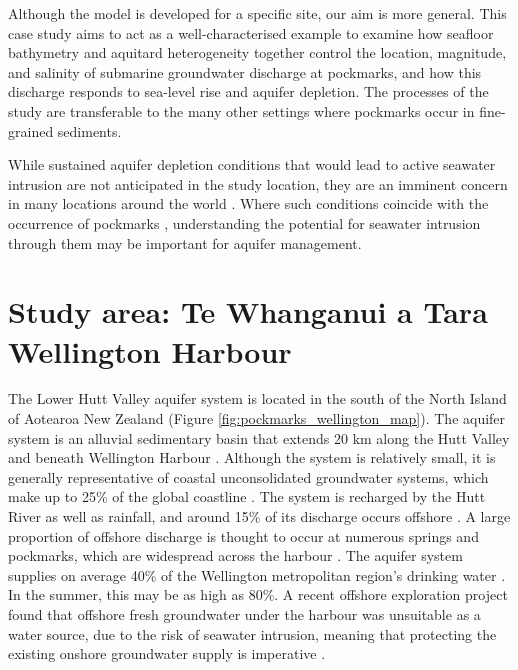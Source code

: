 \documentclass[pdflatex,sn-apa]{sn-jnl}%
\begin{document}
Although the model is developed for a specific site, our aim is more general.
This case study aims to act as a well-characterised example to examine how seafloor bathymetry and aquitard heterogeneity together control the location, magnitude, and salinity of submarine groundwater discharge at pockmarks,
and how this discharge responds to sea-level rise and aquifer depletion.
The processes of the study are transferable to the many other settings where pockmarks occur in fine-grained sediments.

While sustained aquifer depletion conditions that would lead to active seawater intrusion are not anticipated in the study location,
they are an imminent concern in many locations around the world \citep{michael_science_2017, ferguson_vulnerability_2012, zamrsky_global_2024}.
Where such conditions coincide with the occurrence of pockmarks \citep{mendecki_saltwater_2025},
understanding the potential for seawater intrusion through them may be important for aquifer management.

\section{Study area: Te Whanganui a Tara Wellington Harbour}

The Lower Hutt Valley aquifer system is located in the south of the North Island of Aotearoa New Zealand (Figure \ref{fig:pockmarks_wellington_map}).
The aquifer system is an alluvial sedimentary basin that extends 20 km along the Hutt Valley and beneath Wellington Harbour \citep{begg_revised_2023}.
Although the system is relatively small, it is generally representative of coastal unconsolidated groundwater systems,
which make up to 25\% of the global coastline \citep{zamrsky_geological_2020, zamrsky_global_2024}.
The system is recharged by the Hutt River as well as rainfall, and around 15\% of its discharge occurs offshore \citep{bennett_hutt_2024}.
A large proportion of offshore discharge is thought to occur at numerous springs and pockmarks, which are widespread across the harbour \citep{hoffmann_fresh_2023, harding_characteristics_2000}.
The aquifer system supplies on average 40\% of the Wellington metropolitan region's drinking water \citep{begg_revised_2023}.
In the summer, this may be as high as 80\%. A recent offshore exploration project found that offshore fresh groundwater under the harbour was unsuitable as a water source,
due to the risk of seawater intrusion, meaning that protecting the existing onshore groundwater supply is imperative \citep{gyopari_wellington_2018, morgan_likelihood_2022}.
\end{document}
